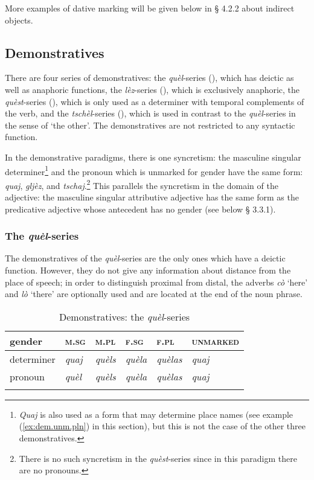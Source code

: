 More examples of dative marking will be given below in § 4.2.2 about indirect objects.

\subsection{Demonstratives}
There are four series of demonstratives: the \textit{quèl}-series (), which has deictic as well as anaphoric functions, the \textit{lèz}-series ({}), which is exclusively anaphoric, the \textit{quèst}-series ({}), which is only used as a determiner with temporal complements of the verb, and the \textit{tschèl}-series  ({}), which is used in contrast to the \textit{quèl}-series in the sense of `the other'. The demonstratives are not restricted to any syntactic function.

In the demonstrative paradigms, there is one syncretism: the masculine singular determiner\footnote{\textit{Quaj} is also used as a form that may determine place names (see example (\ref{ex:dem.unm.pln}) in this section), but this is not the case of the other three demonstratives.} and the pronoun which is unmarked for gender have the same form: \textit{quaj}, \textit{gljèz}, and \textit{tschaj}.\footnote{There is no such syncretism in the \textit{quèst}-series since in this paradigm there are no pronouns.} This parallels the syncretism in the domain of the adjective: the masculine singular attributive adjective has the same form as the predicative adjective whose antecedent has no gender (see below § 3.3.1).

\subsubsection{The \textit{quèl}-series}

The demonstratives of the \textit{quèl}-series are the only ones which have a deictic function. However, they do not give any information about distance from the place of speech; in order to distinguish proximal from distal, the adverbs \textit{cò} `here' and \textit{lò} `there' are optionally used and are located at the end of the noun phrase.

\begin{table}
\caption{Demonstratives: the \textit{quèl}-series}
\label{demquel}
 \begin{tabular}{llllll}
  \lsptoprule
   gender         & \textsc{m.sg} & \textsc{m.pl} & \textsc{f.sg} & \textsc{f.pl} & \textsc{unmarked}\\
  \midrule
  determiner  & \textit{quaj} &  \textit{quèls}  & \textit{quèla}  & \textit{quèlas} & \textit{quaj}\\
  pronoun  & \textit{quèl} & \textit{quèls} & \textit{quèla} & \textit{quèlas} & \textit{quaj}\\
  \lspbottomrule
 \end{tabular}
\end{table}

